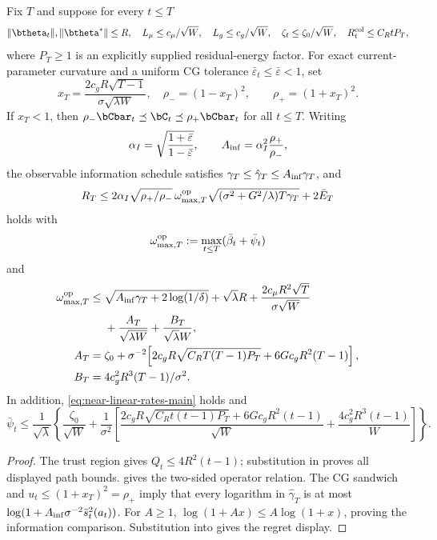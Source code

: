 \begin{corollary}\label{cor:near-linear}
Fix $T$ and suppose for every $t\le T$
\[
 \|\btheta_t\|,\|\btheta^*\|\le R,\quad
 L_\mu\le c_\mu/\sqrt W,\quad L_g\le c_g/\sqrt W,\quad
 \zeta_t\le\zeta_0/\sqrt W,\quad
 R_t^{\rm col}\le C_RtP_T ,
\]
where $P_T\ge1$ is an explicitly supplied residual-energy factor.  For exact
current-parameter curvature and a uniform CG tolerance
$\bar\varepsilon_t\le\bar\varepsilon<1$, set
\[
 x_T=\frac{2c_gR\sqrt{T-1}}{\sigma\sqrt{\lambda W}},\quad
 \rho_-=(1-x_T)^2,\qquad
 \rho_+=(1+x_T)^2.
\]
If $x_T<1$, then
$\rho_-\bCbar_t\preceq\bC_t\preceq\rho_+\bCbar_t$ for all $t\le T$.
Writing
\[
 \alpha_I=\sqrt{\frac{1+\bar\varepsilon}{1-\bar\varepsilon}},\qquad
 A_{\rm inf}=\alpha_I^2\frac{\rho_+}{\rho_-},
\]
the observable information schedule satisfies
$\gamma_T\le\hat\gamma_T\le A_{\rm inf}\gamma_T$, and
\begin{equation}\label{eq:near-linear-regret-gamma}
R_T\le2\alpha_I\sqrt{\rho_+/\rho_-}\,\omega_{\max,T}^{\rm op}
 \sqrt{(\sigma^2+G^2/\lambda)T\gamma_T}+2\bar E_T
\end{equation}
holds with
\[\omega_{\max,T}^{\rm op}:=
\max_{t\le T}(\bar\beta_t+\bar\psi_t)\]
and
\begin{align*}
 \omega_{\max,T}^{\rm op}\le{}&
 \sqrt{A_{\rm inf}\gamma_T+2\log(1/\delta)}+\sqrt\lambda R
 +\frac{2c_\mu R^2\sqrt T}{\sigma\sqrt W}\\
 &+\frac{A_T}{\sqrt{\lambda W}}+\frac{B_T}{\sqrt\lambda W},\\
 A_T={}&\zeta_0+\sigma^{-2}\!\left[
 2c_gR\sqrt{C_RT(T-1)P_T}+6Gc_gR^2(T-1)\right],\\
 B_T={}&4c_g^2R^3(T-1)/\sigma^2 .
\end{align*}
In addition, \eqref{eq:near-linear-rates-main} holds and
\[
 \bar\psi_t\le\frac1{\sqrt\lambda}\!\left\{
 \frac{\zeta_0}{\sqrt W}+\frac1{\sigma^2}\!\left[
 \frac{2c_gR\sqrt{C_Rt(t-1)P_T}+6Gc_gR^2(t-1)}{\sqrt W}
 +\frac{4c_g^2R^3(t-1)}{W}\right]\right\}.
\]
\end{corollary}
\begin{proof}
The trust region gives $Q_t\le4R^2(t-1)$; substitution in
 proves all displayed path bounds.
 gives the two-sided operator relation.
The CG sandwich and $u_t\le(1+x_T)^2=\rho_+$ imply that every logarithm in
$\hat\gamma_T$ is at most
$\log(1+A_{\rm inf}\sigma^{-2}\bar s_t^2(a_t))$.
For $A\ge1$, $\log(1+Ax)\le A\log(1+x)$, proving the information comparison.
Substitution into  gives the regret display.
\end{proof}


